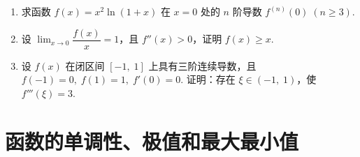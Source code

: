\begin{enumerate}
    \item 求函数 $f(x)=x^2\ln(1+x)$ 在 $x=0$ 处的 $n$ 阶导数 $f^{(n)}(0)\;(n\geqslant3)$.
    
    \item 设 $\displaystyle\lim_{x\to0}\dfrac{f(x)}{x}=1$，且 $f''(x)>0$，证明 $f(x)\geqslant x$.
    
    \item 设 $f(x)$ 在闭区间 $[-1,\;1]$ 上具有三阶连续导数，且 $f(-1)=0,\;f(1)=1,\;f'(0)=0$. 
    证明：存在 $\xi\in(-1,\;1)$，使 $f'''(\xi)=3$.


\end{enumerate}

\section{函数的单调性、极值和最大最小值}

